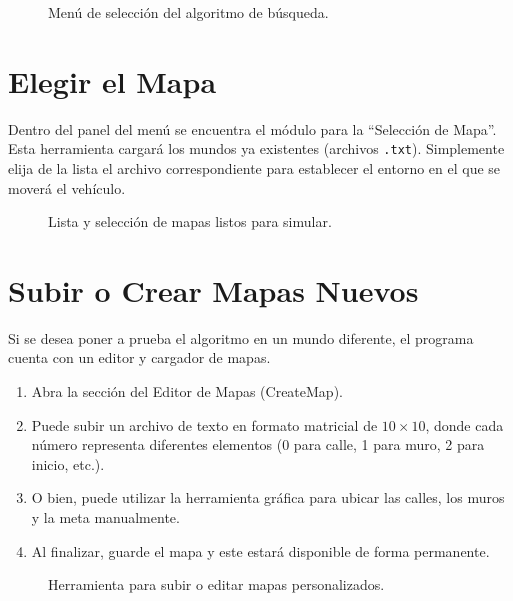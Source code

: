 \documentclass[12pt]{article}
\begin{document}
\begin{figure}[h!]
    \centering
    \vspace{6cm} %
    \caption{Menú de selección del algoritmo de búsqueda.}
\end{figure}

\section{Elegir el Mapa}
Dentro del panel del menú se encuentra el módulo para la ``Selección de Mapa''. Esta herramienta cargará los mundos ya existentes (archivos \texttt{.txt}). Simplemente elija de la lista el archivo correspondiente para establecer el entorno en el que se moverá el vehículo.

\begin{figure}[h!]
    \centering
    \vspace{6cm} %
    \caption{Lista y selección de mapas listos para simular.}
\end{figure}

\section{Subir o Crear Mapas Nuevos}
Si se desea poner a prueba el algoritmo en un mundo diferente, el programa cuenta con un editor y cargador de mapas. 
\begin{enumerate}
    \item Abra la sección del Editor de Mapas (CreateMap).
    \item Puede subir un archivo de texto en formato matricial de $10 \times 10$, donde cada número representa diferentes elementos (0 para calle, 1 para muro, 2 para inicio, etc.).
    \item O bien, puede utilizar la herramienta gráfica para ubicar las calles, los muros y la meta manualmente.
    \item Al finalizar, guarde el mapa y este estará disponible de forma permanente.
\end{enumerate}

\begin{figure}[h!]
    \centering
    \vspace{6cm} %
    \caption{Herramienta para subir o editar mapas personalizados.}
\end{figure}
\end{document}
